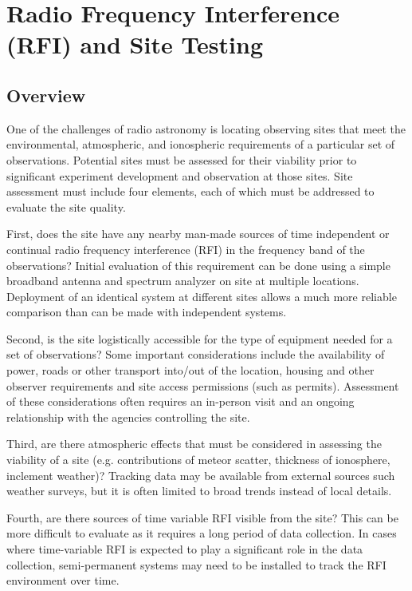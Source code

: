 \chapter{Radio Frequency Interference (RFI) and Site Testing} \label{Ch:RFI}

\section{Overview}

One of the challenges of radio astronomy is locating observing sites that meet the environmental, atmospheric, and ionospheric requirements of a particular set of observations. Potential sites must be assessed for their viability prior to significant experiment development and observation at those sites. Site assessment must include four elements, each of which must be addressed to evaluate the site quality. 

First, does the site have any nearby man-made sources of time independent or continual radio frequency interference (RFI) in the frequency band of the observations? Initial evaluation of this requirement can be done using a simple broadband antenna and spectrum analyzer on site at multiple locations. Deployment of an identical system at different sites allows a much more reliable comparison than can be made with independent systems. 

Second, is the site logistically accessible for the type of equipment needed for a set of observations? Some important considerations include the availability of power, roads or other transport into/out of the location, housing and other observer requirements and site access permissions (such as permits). Assessment of these considerations often requires an in-person visit and an ongoing relationship with the agencies controlling the site.

Third, are there atmospheric effects that must be considered in assessing the viability of a site (e.g. contributions of meteor scatter, thickness of ionosphere, inclement weather)? Tracking data may be available from external sources such weather surveys, but it is often limited to broad trends instead of local details. 

Fourth, are there sources of time variable RFI visible from the site? This can be more difficult to evaluate as it requires a long period of data collection. In cases where time-variable RFI is expected to play a significant role in the data collection, semi-permanent systems may need to be installed to track the RFI environment over time. 


